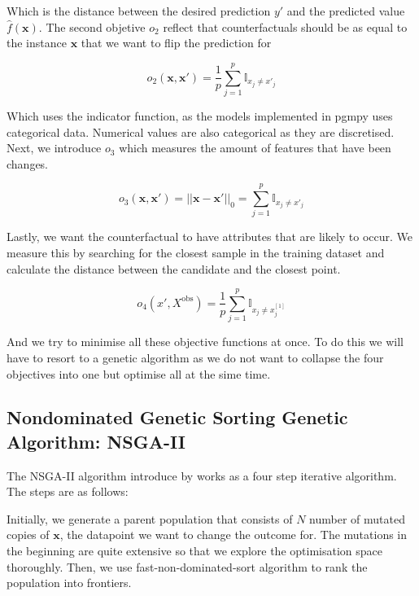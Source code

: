 Which is the distance between the desired prediction $y'$ and the predicted value $\hat{f}(\boldsymbol{x})$.  The second objetive $o_2$ reflect that counterfactuals should be as equal to the instance $\boldsymbol{x}$ that we want to flip the prediction for

\begin{equation*}
    o_2(\boldsymbol{x}, \boldsymbol{x'}) = \frac{1}{p} \sum_{j=1}^{p} \mathbb{I}_{x_j \neq x'_j}
 \end{equation*}

Which uses the indicator function,  as the models implemented in pgmpy uses categorical data. Numerical values are also categorical as they are discretised. Next, we introduce $o_3$ which measures the amount of features that have been changes.

\begin{equation*}
    o_3(\boldsymbol{x}, \boldsymbol{x'}) = ||\boldsymbol{x} - \boldsymbol{x'}||_0 = \sum_{j=1}^{p} \mathbb{I}_{x_j \neq x'_j}
\end{equation*}

Lastly, we want the counterfactual to have attributes that are likely to occur. We measure this by searching for the closest sample in the training dataset and calculate the distance between the candidate and the closest point.

\begin{equation*}
    o_4(x', X^\text{obs}) = \frac{1}{p} \sum_{j=1}^{p} \mathbb{I}_{x_j \neq x^{[1]}_j}
\end{equation*}

And we try to minimise all these objective functions at once. To do this we will have to resort to a genetic algorithm as we do not want to collapse the four objectives into one but optimise all at the sime time.

\subsection{Nondominated Genetic Sorting Genetic Algorithm: NSGA-II}

The NSGA-II algorithm introduce by \citet{Pratap:2002:IEEE.Trans.Evol.Comput.} works as a four step iterative algorithm. The steps are as follows:

Initially, we generate a parent population that consists of $N$ number of mutated copies of $\boldsymbol{x}$, the datapoint we want to change the outcome for. The mutations in the beginning are quite extensive so that we explore the optimisation space thoroughly. Then, we use fast-non-dominated-sort algorithm \cite[p.~184]{Pratap:2002:IEEE.Trans.Evol.Comput.} to rank the population into frontiers. 

